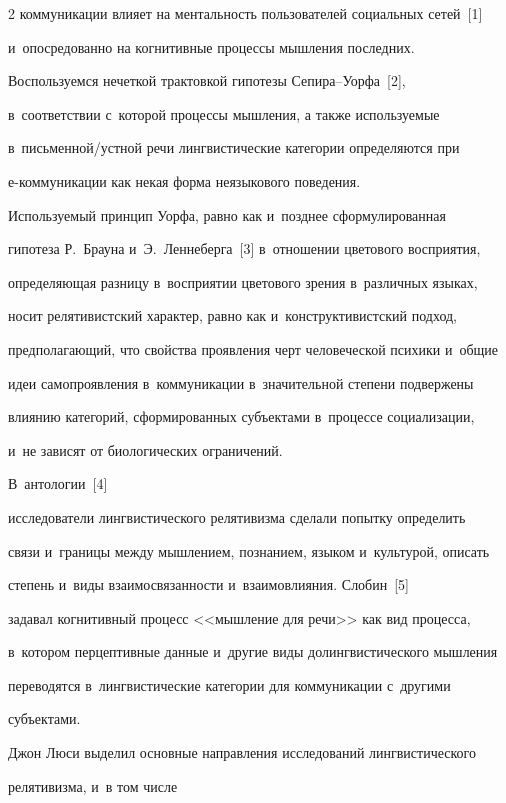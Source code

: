 \begin{multicols}{2}
коммуникации влияет на ментальность пользователей социальных сетей~[1] 

и~опосредованно на когнитивные процессы мышления последних. 



Воспользуемся нечеткой трактовкой гипотезы Се\-пи\-ра--Уор\-фа~[2], 

в~соответствии с~которой процессы мышления, а также используемые 

в~письменной/устной речи лингвистические категории определяются при 

е-ком\-му\-ни\-ка\-ции как некая форма неязыкового поведения.

  

  Используемый принцип Уорфа, равно как и~позднее сформулированная 

гипотеза Р.~Брауна и~Э.~Леннеберга~[3] в~отношении цветового восприятия, 

определяющая разницу в~восприятии цветового зрения в~различных языках, 

носит релятивистский характер, равно как и~конструктивистский подход, 

предполагающий, что свойства проявления черт человеческой психики и~общие 

идеи самопроявления в~коммуникации в~значительной степени подвержены 

влиянию категорий, сформированных субъектами в~процессе социализации, 

и~не зависят от биологических ограничений.

  

  В~антологии~[4] 

исследователи лингвистического релятивизма сделали попытку определить 

связи и~границы между мышлением, познанием, языком и~культурой, описать 

степень и~виды взаимосвязанности и~взаимовлияния. Слобин~[5] 

задавал когнитивный процесс <<мышление для речи>> как вид процесса, 

в~котором перцептивные данные и~другие виды долингвистического мышления 

переводятся в~лингвистические категории для коммуникации с~другими 

субъ\-ек\-тами. 

  

  Джон Люси выделил основные направления исследований лингвистического 

релятивизма, и~в том числе %


\end{multicols}
